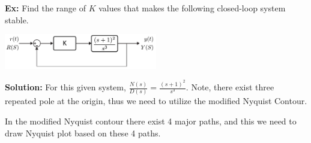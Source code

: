 \documentclass[twoside]{article}
\begin{document}
\newpage

\textbf{Ex:} Find the range of $K$ values that makes the
following closed-loop system stable. 

\vspace{6 pt}

  \begin{minipage}[h]{1\linewidth}
    \begin{center}
      \includegraphics[width=0.5\textwidth]{ex6block}
    \end{center}
  \end{minipage}

\vspace{6 pt}

\textbf{Solution:} For this given system, $\frac{N(s)}{D(s)} =
\frac{(s+1)^2}{s^3}$. Note, there exist three repeated pole at the origin, thus 
we need to utilize the modified Nyquist Contour. 

In the modified Nyquist contour there exist 4 major paths, 
and this we need to draw Nyquist plot based on these 4 paths. 
\end{document}
